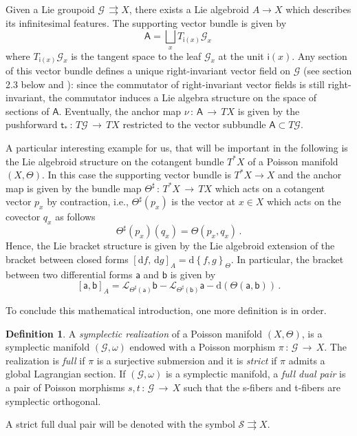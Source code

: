 \documentclass[12pt,a4paper]{article}
\numberwithin{equation}{section}
\theoremstyle{definition}
\newtheorem{definition}[equation]{Definition}
\newcommand{\cG}{\mathcal{G}}
\newcommand{\cS}{\mathcal{S}}
\newcommand{\dd}{\mathrm{d}}
\newcommand{\sfs}{\mathsf{s}}
\newcommand{\sft}{\mathsf{t}}
\newcommand{\sfi}{\mathsf{i}}
\newcommand{\sfa}{\mathsf{a}}
\newcommand{\sfA}{\mathsf{A}}
\newcommand{\st}{\rightrightarrows}
\newcommand{\be}{\begin{equation}}
\newcommand{\ee}{\end{equation}}
\begin{document}
Given a Lie groupoid $\cG\,\rightrightarrows X$, there exists a Lie algebroid $A\rightarrow X$ which describes its infinitesimal features. The supporting vector bundle is given by 
\be
\sfA = \bigsqcup_{x} T_{\sfi(x)}\cG_x\,  
\ee
where $T_{\sfi(x)}\cG_x$ is the tangent space to the leaf $\cG_x$ at the unit $\sfi(x)$.
Any section of this vector bundle defines a unique right-invariant vector field on $\cG$ (see section 2.3 below and \cite{Mackenzie}): since the commutator of right-invariant vector fields is still right-invariant, the commutator induces a Lie algebra structure on the space of sections of $\sfA$. Eventually, the anchor map $\nu\,\colon\,\sfA\,\rightarrow \,TX$ is given by the pushforward $\sft_{*}\,\colon \, T\cG \,\rightarrow\,TX$ restricted to the vector subbundle $\sfA\subset T\cG$.%

A particular interesting example  for us, that will be important in the following  is the Lie algebroid structure on the cotangent bundle $T^*X$ of a Poisson manifold $(X,\Theta)$. In this case the supporting vector bundle is $T^*X\rightarrow X $ and the anchor map is given by the bundle map $\Theta^{\sharp}\,\colon\,T^*X\,\rightarrow\,TX$ which acts on a cotangent vector $p_x$ by contraction, i.e., $\Theta^{\sharp}(p_x)$ is the vector at $x\in X$ which acts on the covector $q_x$ as follows 
\be 
\Theta^{\sharp}(p_x)(q_x) = \Theta(p_x,q_x)\,.
\ee
Hence, the Lie bracket structure is given by the Lie algebroid extension of the bracket between closed forms $\left[ \dd f, \,\dd g \right]_A = \dd \left\lbrace f,g \right\rbrace_{\Theta}$. In particular, the bracket between two differential forms $\sfa$ and $\mathsf{b}$ is given by
\begin{equation}
    \left[ \sfa , \mathsf{b} \right]_A = \mathcal{L}_{\Theta^{\sharp}(\sfa)}\mathsf{b} - \mathcal{L}_{\Theta^{\sharp}(\mathsf{b})}\mathsf{a} - \dd \left( \Theta(\sfa, \mathsf{b}) \right)\, .
\end{equation}
 
To conclude this mathematical introduction, one more definition is in order. 

\begin{definition}\label{def.1}
 A \textit{symplectic realization} of a Poisson manifold $(X, \Theta)$,  is a symplectic manifold $(\cG, \omega)$ endowed with a Poisson morphism $\pi\,\colon\, \cG \,\rightarrow \,X$. The realization is \textit{full} if $\pi$ is a surjective submersion and it is \textit{strict} if $\pi$ admits a global Lagrangian section. If $(\cG, \omega)$ is a symplectic manifold, a \textit{full dual pair} is a pair of Poisson morphisms $s,t\,\colon\,\cG\,\rightarrow\,X$ such that the s-fibers and t-fibers are symplectic orthogonal. 
\end{definition}
A strict full dual pair will be denoted with the symbol $\cS \st X$. 
\end{document}
